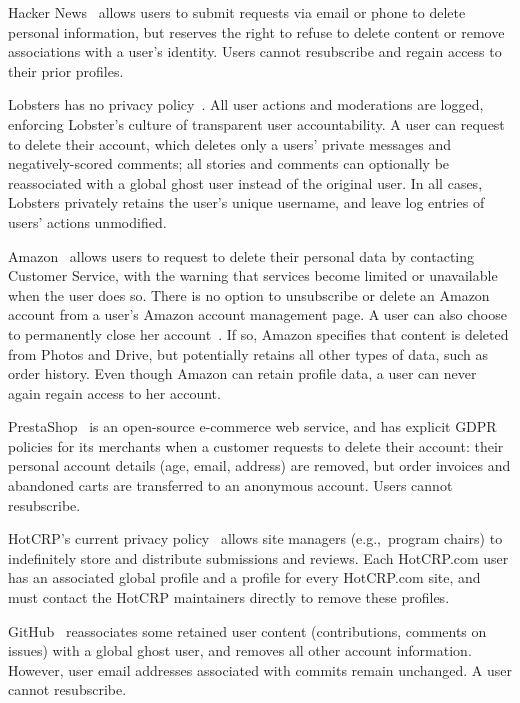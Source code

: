 Hacker News~\cite{hackernews:privacy} allows users to submit requests via email or phone to delete
personal information, but reserves the right to refuse to delete content or remove associations with
a user's identity.  Users cannot resubscribe and regain access to their prior profiles.

Lobsters has no privacy policy~\cite{lobsters:privacy}. All user actions and moderations are
logged, enforcing Lobster's culture of transparent user accountability. A user can request to delete
their account, which deletes only a users' private messages and negatively-scored comments; all
stories and comments can optionally be reassociated with a global ghost user instead of the original
user. In all cases, Lobsters privately retains the user's unique username, and leave log entries of users'
actions unmodified.

Amazon~\cite{amazon:privacy} allows users to request to delete their personal data by contacting
Customer Service, with the warning that services become limited or unavailable when the user does
so. There is no option to unsubscribe or delete an Amazon account from a user's Amazon account
management page.  A user can also choose to permanently close her account~\cite{amazon:close}. If
so, Amazon specifies that content is deleted from Photos and Drive, but potentially retains all other types
of data, such as order history. Even though Amazon can retain profile data, a user can never
again regain access to her account.

PrestaShop~\cite{prestashop:privacy} is an open-source e-commerce web service, and has explicit GDPR
policies for its merchants when a customer requests to delete their account: their personal account
details (age, email, address) are removed, but order invoices and abandoned carts are transferred to
an anonymous account. Users cannot resubscribe.

HotCRP's current privacy policy~\cite{hotcrp:privacy} allows site managers (e.g.,\ program chairs)
to indefinitely store and distribute submissions and reviews. Each HotCRP.com user has an associated
global profile and a profile for every HotCRP.com site, and must contact the HotCRP maintainers
directly to remove these profiles.

GitHub~\cite{github:privacy} reassociates some retained user content (contributions, comments on
issues) with a global ghost user, and removes all other account information. However, user email
addresses associated with commits remain unchanged. A user cannot resubscribe.


